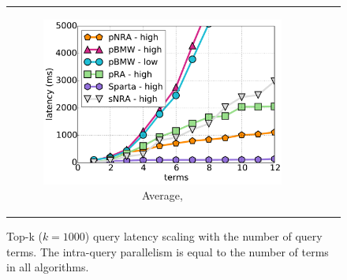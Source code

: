 \begin{figure}[tbh]
\begin{tabular}{ccc}
    \begin{subfigure}[t]{0.3\textwidth}
    \includegraphics[width=\textwidth]{figures/latency_12threads_cluewebX10.pdf}
	\caption{Average, \cwten}
    \end{subfigure}  
\end{tabular}
\caption{Top-k ($k=1000$) query latency scaling with the number of query terms. 
The intra-query parallelism is equal to the number of terms in all algorithms. }
\label{fig:terms-scaling}
\end{figure}



